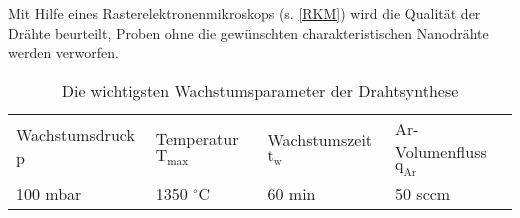 Mit Hilfe eines Rasterelektronenmikroskops (s. \autoref{RKM}) wird die Qualität der Drähte beurteilt, Proben ohne die gewünschten charakteristischen Nanodrähte werden verworfen.\\
\begin{table}
\begin{tabular}{llll}
Wachstumsdruck p & Temperatur $\text{T}_\text{max}$ & Wachstumszeit $\text{t}_\text{w}$ & Ar-Volumenfluss $\text{q}_\text{Ar}$ \\ 
100 mbar & 1350 $^{\circ}$C & 60 min & 50 sccm \\ 
\end{tabular}
\caption[VLS-Wachstumsparameter]{Die wichtigsten Wachstumsparameter der Drahtsynthese} 
\end{table}